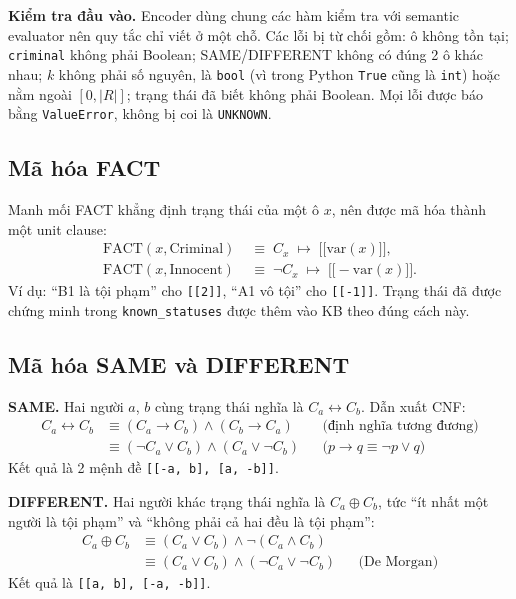 \textbf{Kiểm tra đầu vào.} Encoder dùng chung các hàm kiểm tra với semantic
evaluator nên quy tắc chỉ viết ở một chỗ. Các lỗi bị từ chối gồm: ô không tồn
tại; \texttt{criminal} không phải Boolean; SAME/DIFFERENT không có đúng 2 ô
khác nhau; $k$ không phải số nguyên, là \texttt{bool} (vì trong Python
\texttt{True} cũng là \texttt{int}) hoặc nằm ngoài $[0, |R|]$; trạng thái đã
biết không phải Boolean. Mọi lỗi được báo bằng \texttt{ValueError}, không bị
coi là \texttt{UNKNOWN}.

\subsection{Mã hóa FACT}
Manh mối FACT khẳng định trạng thái của một ô $x$, nên được mã hóa thành một
unit clause:
\begin{align*}
\text{FACT}(x,\text{Criminal}) &\;\equiv\; C_x \;\mapsto\; \texttt{[[}\mathrm{var}(x)\texttt{]]},\\
\text{FACT}(x,\text{Innocent}) &\;\equiv\; \neg C_x \;\mapsto\; \texttt{[[}-\mathrm{var}(x)\texttt{]]}.
\end{align*}
Ví dụ: ``B1 là tội phạm'' cho \texttt{[[2]]}, ``A1 vô tội'' cho \texttt{[[-1]]}.
Trạng thái đã được chứng minh trong \texttt{known\_statuses} được thêm vào KB
theo đúng cách này.

\subsection{Mã hóa SAME và DIFFERENT}
\textbf{SAME.} Hai người $a$, $b$ cùng trạng thái nghĩa là $C_a \leftrightarrow C_b$.
Dẫn xuất CNF:
\begin{align*}
C_a \leftrightarrow C_b
&\equiv (C_a \rightarrow C_b) \wedge (C_b \rightarrow C_a) && \text{(định nghĩa tương đương)}\\
&\equiv (\neg C_a \vee C_b) \wedge (C_a \vee \neg C_b) && \text{(}p \rightarrow q \equiv \neg p \vee q\text{)}
\end{align*}
Kết quả là 2 mệnh đề \texttt{[[-a, b], [a, -b]]}.

\textbf{DIFFERENT.} Hai người khác trạng thái nghĩa là $C_a \oplus C_b$, tức
``ít nhất một người là tội phạm'' và ``không phải cả hai đều là tội phạm'':
\begin{align*}
C_a \oplus C_b
&\equiv (C_a \vee C_b) \wedge \neg(C_a \wedge C_b)\\
&\equiv (C_a \vee C_b) \wedge (\neg C_a \vee \neg C_b) && \text{(De Morgan)}
\end{align*}
Kết quả là \texttt{[[a, b], [-a, -b]]}.

